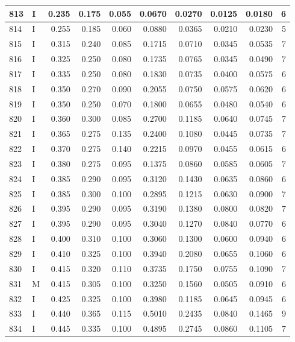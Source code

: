 \documentclass[9pt,twocolumn,twoside,]{pnas-new}
\begin{document}
\begin{tabular}{l|l|r|r|r|r|r|r|r|r}
\hline
813 & I & 0.235 & 0.175 & 0.055 & 0.0670 & 0.0270 & 0.0125 & 0.0180 & 6\\
\hline
814 & I & 0.255 & 0.185 & 0.060 & 0.0880 & 0.0365 & 0.0210 & 0.0230 & 5\\
\hline
815 & I & 0.315 & 0.240 & 0.085 & 0.1715 & 0.0710 & 0.0345 & 0.0535 & 7\\
\hline
816 & I & 0.325 & 0.250 & 0.080 & 0.1735 & 0.0765 & 0.0345 & 0.0490 & 7\\
\hline
817 & I & 0.335 & 0.250 & 0.080 & 0.1830 & 0.0735 & 0.0400 & 0.0575 & 6\\
\hline
818 & I & 0.350 & 0.270 & 0.090 & 0.2055 & 0.0750 & 0.0575 & 0.0620 & 6\\
\hline
819 & I & 0.350 & 0.250 & 0.070 & 0.1800 & 0.0655 & 0.0480 & 0.0540 & 6\\
\hline
820 & I & 0.360 & 0.300 & 0.085 & 0.2700 & 0.1185 & 0.0640 & 0.0745 & 7\\
\hline
821 & I & 0.365 & 0.275 & 0.135 & 0.2400 & 0.1080 & 0.0445 & 0.0735 & 7\\
\hline
822 & I & 0.370 & 0.275 & 0.140 & 0.2215 & 0.0970 & 0.0455 & 0.0615 & 6\\
\hline
823 & I & 0.380 & 0.275 & 0.095 & 0.1375 & 0.0860 & 0.0585 & 0.0605 & 7\\
\hline
824 & I & 0.385 & 0.290 & 0.095 & 0.3120 & 0.1430 & 0.0635 & 0.0860 & 6\\
\hline
825 & I & 0.385 & 0.300 & 0.100 & 0.2895 & 0.1215 & 0.0630 & 0.0900 & 7\\
\hline
826 & I & 0.395 & 0.290 & 0.095 & 0.3190 & 0.1380 & 0.0800 & 0.0820 & 7\\
\hline
827 & I & 0.395 & 0.290 & 0.095 & 0.3040 & 0.1270 & 0.0840 & 0.0770 & 6\\
\hline
828 & I & 0.400 & 0.310 & 0.100 & 0.3060 & 0.1300 & 0.0600 & 0.0940 & 6\\
\hline
829 & I & 0.410 & 0.325 & 0.100 & 0.3940 & 0.2080 & 0.0655 & 0.1060 & 6\\
\hline
830 & I & 0.415 & 0.320 & 0.110 & 0.3735 & 0.1750 & 0.0755 & 0.1090 & 7\\
\hline
831 & M & 0.415 & 0.305 & 0.100 & 0.3250 & 0.1560 & 0.0505 & 0.0910 & 6\\
\hline
832 & I & 0.425 & 0.325 & 0.100 & 0.3980 & 0.1185 & 0.0645 & 0.0945 & 6\\
\hline
833 & I & 0.440 & 0.365 & 0.115 & 0.5010 & 0.2435 & 0.0840 & 0.1465 & 9\\
\hline
834 & I & 0.445 & 0.335 & 0.100 & 0.4895 & 0.2745 & 0.0860 & 0.1105 & 7\\

\end{tabular}
\end{document}
